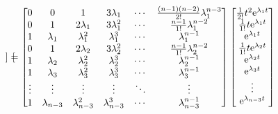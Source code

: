 \documentclass[11pt,a4paper]{ctexart}
\newcommand{\e}{{\rm e}}
\begin{document}
\begin{itemize}
\begin{itemize}
\[\begin{bmatrix}
                \end{bmatrix}=
                \begin{bmatrix}
                    0 & 0 & 1 & 3\lambda_1 & \cdots & \frac{(n-1)(n-2)}{2!}\lambda_1^{n-3}\\
                    0 & 1 & 2\lambda_1 & 3\lambda_1^2 & \cdots & \frac{n-1}{1!}\lambda_1^{n-2}\\
                    1 & \lambda_1 & \lambda_1^2 & \lambda_1^3 & \cdots & \lambda_1^{n-1}\\
                    0 & 1 & 2\lambda_2 & 3\lambda_2^2 & \cdots & \frac{n-1}{1!}\lambda_2^{n-2}\\
                    1 & \lambda_2 & \lambda_2^2 & \lambda_2^3 & \cdots & \lambda_2^{n-1}\\
                    1 & \lambda_3 & \lambda_3^2 & \lambda_3^3 & \cdots & \lambda_3^{n-1}\\
                    \vdots & \vdots & \vdots & \vdots & \ddots & \vdots \\
                    1 & \lambda_{n-3} & \lambda_{n-3}^2 & \lambda_{n-3}^3 & \cdots & \lambda_{n-3}^{n-1}\\
                \end{bmatrix}
                \begin{bmatrix}
                    \frac{1}{2!}t^2\e^{\lambda_1t}\\ 
                    \frac{1}{1!}t\e^{\lambda_1t} \\ 
                    \e^{\lambda_1t} \\ 
                    \frac{1}{1!}t\e^{\lambda_2t} \\ 
                    \e^{\lambda_2t}\\ 
                    \e^{\lambda_3t}\\
                    \vdots \\ 
                    \e^{\lambda_{n-3}t} \\
                \end{bmatrix}
                \]
            \end{itemize}
            \end{itemize}
\end{document}
